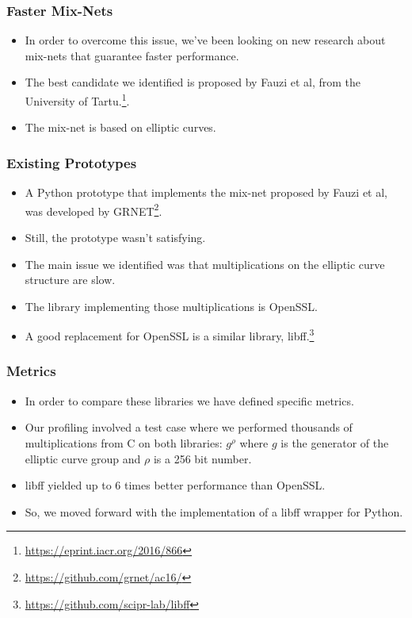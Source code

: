 \documentclass{beamer}
\begin{document}
    \begin{frame}
        \frametitle{Faster Mix-Nets}
        \begin{itemize}
            \item In order to overcome this issue, we've been looking on new
            research about mix-nets that guarantee faster performance.
            \item The best candidate we identified is proposed by Fauzi et al,
            from the University of Tartu.\footnote{
                \url{https://eprint.iacr.org/2016/866}
            }.
            \item The mix-net is based on elliptic curves.
        \end{itemize}
    \end{frame}

    \begin{frame}
        \frametitle{Existing Prototypes}
        \begin{itemize}
            \item A Python prototype that implements the mix-net proposed by
            Fauzi et al, was developed by GRNET\footnote{
                \url{https://github.com/grnet/ac16/}
            }.
            \item Still, the prototype wasn't satisfying.
            \item The main issue we identified was that multiplications on the
            elliptic curve structure are slow.
            \item The library implementing those multiplications is OpenSSL.
            \item A good replacement for OpenSSL is a similar library,
            libff.\footnote{\url{https://github.com/scipr-lab/libff}}
        \end{itemize}
    \end{frame}

    \begin{frame}
        \frametitle{Metrics}
        \begin{itemize}
            \item In order to compare these libraries we have defined specific 
            metrics.
            \item Our profiling involved a test case where we performed
            thousands of multiplications from C on both libraries:\newline
            $g ^ \rho$
            where $g$ is the generator of the elliptic curve group and
            $\rho$ is a 256 bit number.
            \item libff yielded up to 6 times better performance than OpenSSL.
            \item So, we moved forward with the implementation of a libff
            wrapper for Python.
        \end{itemize}
    \end{frame}
\end{document}
